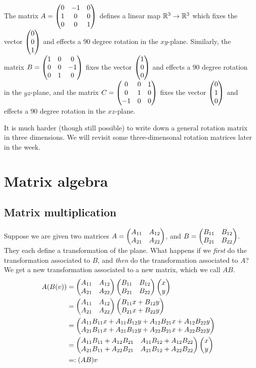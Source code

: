 \documentclass{article}
\begin{document}
\begin{Example}\label{exm:rot3d}
The matrix \(A=\begin{pmatrix} 0 & -1 & 0 \\ 1 & 0 & 0 \\ 0 & 0 & 1\end{pmatrix}\) defines
a linear map \(\mathbb{R}^3\to\mathbb{R}^3\) which fixes the vector \(\begin{pmatrix} 0 \\ 0
\\ 1\end{pmatrix}\) and effects a 90 degree rotation in the
\(xy\)-plane. Similarly, the matrix \(B=\begin{pmatrix} 1 & 0 & 0 \\ 0 & 0 & -1
\\ 0 & 1 & 0 \end{pmatrix}\) fixes the vector \(\begin{pmatrix} 1 \\ 0 \\ 0\end{pmatrix}\) and
effects a 90 degree rotation in the \(yz\)-plane, and the matrix
\(C=\begin{pmatrix} 0 & 0 & 1 \\ 0 & 1 & 0 \\ -1 & 0 & 0\end{pmatrix}\) fixes the vector
\(\begin{pmatrix} 0 \\ 1 \\ 0\end{pmatrix}\) and effects a 90 degree rotation in the
\(xz\)-plane.


\end{Example}
It is much harder (though still possible) to write down a general
rotation matrix in three dimensions. We will revisit some
three-dimensonal rotation matrices later in the week.


\clearpage
\section{Matrix algebra}
\subsection{Matrix multiplication}
Suppose we are given two matrices \(A=\begin{pmatrix} A_{11} & A_{12} \\ A_{21} &
A_{22}\end{pmatrix}\), and \(B=\begin{pmatrix} B_{11} & B_{12} \\ B_{21} & B_{22}\end{pmatrix}\). They
each define a transformation of the plane. What happens if we {\em
first} do the transformation associated to \(B\), and {\em then} do
the transformation associated to \(A\)? We get a new transformation
associated to a new matrix, which we call \(AB\).
\begin{align*}
A(B(v))&=\begin{pmatrix} A_{11} & A_{12} \\ A_{21} & A_{22}\end{pmatrix}\begin{pmatrix} B_{11} & B_{12} \\ B_{21} & B_{22}\end{pmatrix}\begin{pmatrix} x \\ y\end{pmatrix}\\
&=\begin{pmatrix} A_{11} & A_{12} \\ A_{21} & A_{22}\end{pmatrix}\begin{pmatrix} B_{11}x+B_{12}y \\ B_{21}x+B_{22}y\end{pmatrix}\\
&=\begin{pmatrix} A_{11}B_{11}x+A_{11}B_{12}y+A_{12}B_{21}x+A_{12}B_{22}y \\ A_{21}B_{11}x+A_{21}B_{12}y+A_{22}B_{21}x+A_{22}B_{22}y\end{pmatrix}\\
&=\begin{pmatrix} A_{11}B_{11}+A_{12}B_{21} & A_{11}B_{12}+A_{12}B_{22}\\ A_{21}B_{11}+A_{22}B_{21} & A_{21}B_{12}+A_{22}B_{22}\end{pmatrix}\begin{pmatrix} x \\ y\end{pmatrix}\\
&=:(AB)v
\end{align*}
\end{document}
